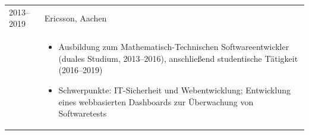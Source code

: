 
\begin{longtable}[l]{@{}p{} p{}}
    2013--2019 & Ericsson, Aachen\\
    & \begin{itemize}
        \item \raggedright Ausbildung zum Mathematisch-Technischen Softwareentwickler (duales Studium, 2013--2016), anschließend studentische Tätigkeit (2016--2019)
        \item \raggedright Schwerpunkte: IT-Sicherheit und Webentwicklung; Entwicklung eines webbasierten Dashboards zur Überwachung von Softwaretests
    \end{itemize}\\
\end{longtable}

